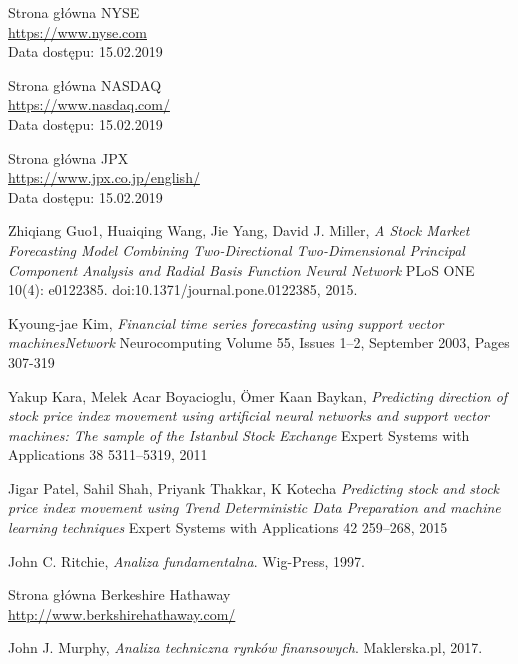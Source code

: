 \documentclass[a4paper, twoside, 11pt, openright]{article}
\begin{document}

\begin{thebibliography}{9}
  
Strona główna NYSE
\\\url{https://www.nyse.com}
\\Data dostępu: 15.02.2019
 
Strona główna NASDAQ
\\\url{https://www.nasdaq.com/}
\\Data dostępu: 15.02.2019

Strona główna JPX
\\\url{https://www.jpx.co.jp/english/}
\\Data dostępu: 15.02.2019

Zhiqiang Guo1, Huaiqing Wang, Jie Yang, David J. Miller,
\textit{A Stock Market Forecasting Model Combining Two-Directional Two-Dimensional Principal Component Analysis and Radial Basis Function Neural Network}
PLoS ONE 10(4): e0122385. doi:10.1371/journal.pone.0122385, 2015.


Kyoung-jae Kim,
\textit{Financial time series forecasting using support vector machinesNetwork}
Neurocomputing Volume 55, Issues 1–2, September 2003, Pages 307-319


Yakup Kara, Melek Acar Boyacioglu, Ömer Kaan Baykan,
\textit{Predicting direction of stock price index movement using artificial neural
networks and support vector machines: The sample of the Istanbul Stock Exchange}
Expert Systems with Applications 38 5311–5319, 2011

Jigar Patel, Sahil Shah, Priyank Thakkar, K Kotecha
\textit{Predicting stock and stock price index movement using Trend
Deterministic Data Preparation and machine learning techniques}
Expert Systems with Applications 42 259–268, 2015

  John C. Ritchie,
  \textit{Analiza fundamentalna}.
  Wig-Press,
  1997.
  
Strona główna Berkeshire Hathaway
\\\url{http://www.berkshirehathaway.com/}

  John J. Murphy,
  \textit{Analiza techniczna rynków finansowych}.
  Maklerska.pl,
  2017.


\end{thebibliography}
\end{document}
